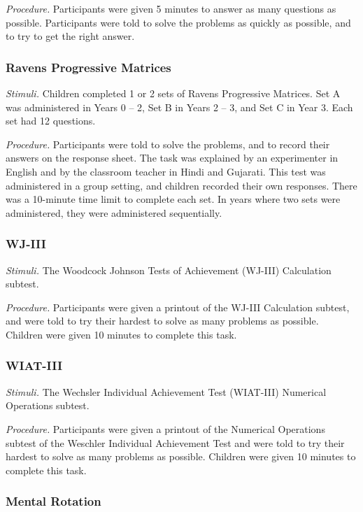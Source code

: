 \documentclass[11pt]{article}
\begin{document}
{\it Procedure.} Participants were given 5 minutes to answer as many questions as possible. Participants were told to solve the problems as quickly as possible, and to try to get the right answer. 

\subsubsection{Ravens Progressive Matrices}

{\it Stimuli.} Children completed 1 or 2 sets of Ravens Progressive Matrices. Set A was administered in Years 0 -- 2, Set B in Years 2 -- 3, and Set C in Year 3. Each set had 12 questions. 

{\it Procedure.} Participants were told to solve the problems, and to record their answers on the response sheet. The task was explained by an experimenter in English and by the classroom teacher in Hindi and Gujarati. This test was administered in a group setting, and children recorded their own responses. There was a 10-minute time limit to complete each set. In years where two sets were administered, they were administered sequentially. 

\subsubsection{WJ-III}

{\it Stimuli.} The Woodcock Johnson Tests of Achievement (WJ-III) Calculation subtest.

{\it Procedure.} Participants were given a printout of the WJ-III Calculation subtest, and were told to try their hardest to solve as many problems as possible. Children were given 10 minutes to complete this task. 

\subsubsection{WIAT-III}

{\it Stimuli.} The Wechsler Individual Achievement Test (WIAT-III) Numerical Operations subtest.

{\it Procedure.} Participants were given a printout of the Numerical Operations subtest of the Weschler Individual Achievement Test and were told to try their hardest to solve as many problems as possible. Children were given 10 minutes to complete this task. 

\subsubsection{Mental Rotation}
\end{document}
